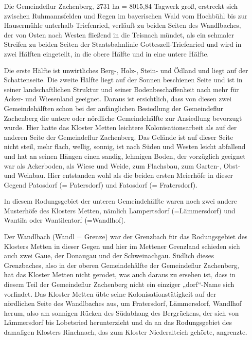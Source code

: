 \documentclass[12pt,a4pager,draft]{book}
\begin{document}
Die Gemeindeflur Zachenberg, 2731 ha = 8015,84 Tagwerk groß, erstreckt sich
zwischen Ruhmannsfelden und Regen im bayerischen Wald vom Hochbühl bis zur
Hausermühle unterhalb Triefenried, verläuft zu beiden Seiten des Wandlbaches,
der von Osten nach Westen fließend in die Teisnach mündet, als ein schmaler
Streifen zu beiden Seiten der Staatsbahnlinie Gotteszell-Triefenried und wird in
zwei Hälften eingeteilt, in die obere Hälfte und in eine untere Hälfte.

Die erste Hälfte ist unwirtliches Berg-, Holz-, Stein- und Ödland und liegt auf
der Schattenseite. Die zweite Hälfte liegt auf der Sonnen beschienen Seite und
ist in seiner landschaftlichen Struktur und seiner Bodenbeschaffenheit nach mehr
für Acker- und Wiesenland geeignet. Daraus ist ersichtlich, dass von diesen zwei
Gemeindehälften schon bei der anfänglichen Besiedlung der Gemeindeflur
Zachenberg die untere oder nördliche Gemeindehälfte zur Ansiedlung bevorzugt
wurde. Hier hatte das Kloster Metten leichtere Kolonisationsarbeit als auf der
anderen Seite der Gemeindeflur Zachenberg. Das Gelände ist auf dieser Seite
nicht steil, mehr flach, wellig, sonnig, ist nach Süden und Westen leicht
abfallend und hat an seinen Hängen einen sandig, lehmigen Boden, der vorzüglich
geeignet war als Ackerboden, als Wiese und Weide, zum Flachsbau, zum Garten-,
Obst- und Weinbau. Hier entstanden wohl als die beiden ersten Meierhöfe in
dieser Gegend Patosdorf (= Patersdorf) und Fatosdorf (= Fratersdorf).

In diesem Rodungsgebiet der unteren Gemeindehälfte waren noch zwei andere
Musterhöfe des Klosters Metten, nämlich Lampertsdorf (=Lämmersdorf) und Wantila
oder Wantilentorf (=Wandlhof).

Der Wandlbach (Wandl = Grenze) war der Grenzbach für das Rodungsgebiet des
Klosters Metten in dieser Gegen und hier im Mettener Grenzland schieden sich
auch zwei Gaue, der Donaugau und der Schweinachgau. Südlich dieses Grenzbaches,
also in der oberen Gemeindehälfte der Gemeindeflur Zachenberg, hat das Kloster
Metten nicht gerodet, was auch daraus zu ersehen ist, dass in diesem Teil der
Gemeindeflur Zachenberg nicht ein einziger „dorf“-Name sich vorfindet. Das
Kloster Metten übte seine Kolonisationstätigkeit auf der nördlichen Seite des
Wandlbaches aus, um Fratersdorf, Lämmersdorf, Wandlhof herum, also am sonnigen
Rücken des Südabhang des Bergrückens, der sich von Lämmersdorf bis Lobetsried
herunterzieht und da an das Rodungsgebiet des damaligen Klosters Rinchnach, das
zum Kloster Niederalteich gehörte, angrenzte.
\end{document}
